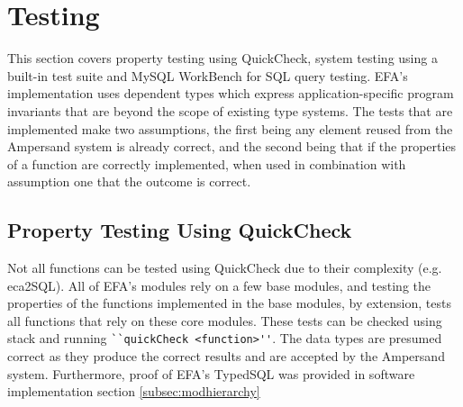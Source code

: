 \section{Testing}

This section covers property testing using QuickCheck, system testing using a 
built-in test suite and MySQL WorkBench for SQL query testing. EFA's 
implementation uses dependent types which express application-specific program 
invariants that are beyond the scope of existing type systems. The tests that 
are implemented make two assumptions, the first being any element reused from 
the Ampersand system is already correct, and the second being that if the 
properties of a function are correctly implemented, when used in combination 
with assumption one that the outcome is correct.

\subsection{Property Testing Using QuickCheck}
Not all functions can be tested using QuickCheck due to their complexity (e.g. 
eca2SQL). All of EFA's modules rely on a few base modules, and testing the 
properties of the functions implemented in the base modules, by extension, 
tests all functions that rely on these core modules. These tests can be checked 
using stack and running \verb|``quickCheck <function>''|. The data types are 
presumed correct as they produce the correct results and are accepted by the 
Ampersand system. Furthermore, proof of EFA's TypedSQL was provided in software 
implementation section \ref{subsec:modhierarchy}
